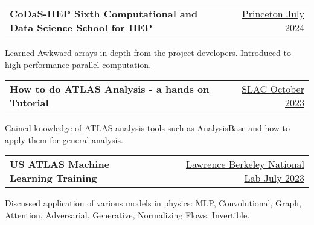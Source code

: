\documentclass[a4paper,12pt]{article}
\makeatletter
\newenvironment{jobshort}[2]
    {
    \begin{tabularx}{\linewidth}{@{}l X r@{}}
    \textbf{#1} & \hfill &  #2 \\[3.75pt]
    \end{tabularx}
    }
    {
    }
\makeatother
\begin{document}
\begin{jobshort}{CoDaS-HEP Sixth Computational and Data Science School for HEP}{\href{https://indico.cern.ch/event/1422680/}{Princeton July 2024}}
Learned Awkward arrays in depth from the project developers. Introduced to high performance parallel computation.
\end{jobshort}

\begin{jobshort}{How to do ATLAS Analysis - a hands on Tutorial}{\href{https://indico.cern.ch/event/1309794/}{SLAC October 2023}}
Gained knowledge of ATLAS analysis tools such as AnalysisBase and how to apply them for general analysis.
\end{jobshort}

\begin{jobshort}{US ATLAS Machine Learning Training}{\href{https://indico.cern.ch/event/1264566/}{Lawrence Berkeley National Lab July 2023}}
Discussed application of various models in physics: MLP, Convolutional, Graph, Attention, Adversarial, Generative, Normalizing Flows, Invertible.
\end{jobshort}

\vfill
{}
\end{document}
